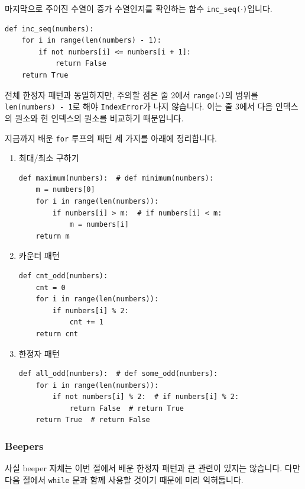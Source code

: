 \documentclass[../main.tex]{subfiles}
\begin{document}
마지막으로 주어진 수열이 증가 수열인지를 확인하는 함수 \texttt{inc\_seq($\cdot$)}입니다.
\begin{verbatim}
def inc_seq(numbers):
	for i in range(len(numbers) - 1):
		if not numbers[i] <= numbers[i + 1]:
			return False
	return True
\end{verbatim}
전체 한정자 패턴과 동일하지만, 주의할 점은 줄 2에서 \texttt{range($\cdot$)}의 범위를 \texttt{len(numbers) - 1}로 해야 \texttt{IndexError}가 나지 않습니다.
이는 줄 3에서 다음 인덱스의 원소와 현 인덱스의 원소를 비교하기 때문입니다.

지금까지 배운 \texttt{for} 루프의 패턴 세 가지를 아래에 정리합니다.
\begin{enumerate}
\item 최대/최소 구하기
\begin{verbatim}
def maximum(numbers):  # def minimum(numbers):
	m = numbers[0]
	for i in range(len(numbers)):
		if numbers[i] > m:  # if numbers[i] < m:
			m = numbers[i]
	return m
\end{verbatim}
\item 카운터 패턴
\begin{verbatim}
def cnt_odd(numbers):
	cnt = 0
	for i in range(len(numbers)):
		if numbers[i] % 2:
			cnt += 1
	return cnt
\end{verbatim}
\item 한정자 패턴
\begin{verbatim}
def all_odd(numbers):  # def some_odd(numbers):
	for i in range(len(numbers)):
		if not numbers[i] % 2:  # if numbers[i] % 2:
			return False  # return True
	return True  # return False
\end{verbatim}
\end{enumerate}

\subsubsection{Beepers}
사실 beeper 자체는 이번 절에서 배운 한정자 패턴과 큰 관련이 있지는 않습니다.
다만 다음 절에서 \texttt{while} 문과 함께 사용할 것이기 때문에 미리 익혀둡니다.
\end{document}
